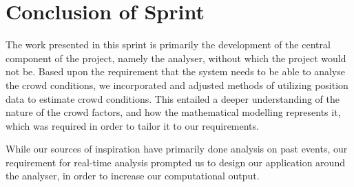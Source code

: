 \section{Conclusion of Sprint}

The work presented in this sprint is primarily the development of the central component of the project, namely the analyser, without which the project would not be. Based upon the requirement that the system needs to be able to analyse the crowd conditions, we incorporated and adjusted methods of utilizing position data to estimate crowd conditions. This entailed a deeper understanding of the nature of the crowd factors, and how the mathematical modelling represents it, which was required in order to tailor it to our requirements.

While our sources of inspiration have primarily done analysis on past events, our requirement for real-time analysis prompted us to design our application around the analyser, in order to increase our computational output.